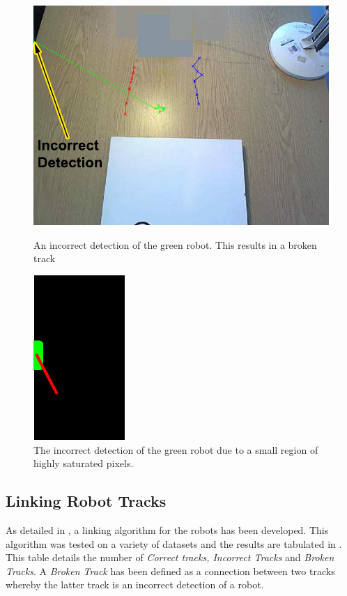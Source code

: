 \documentclass{article}
\begin{document}
\begin{figure}[h!]
\begin{minipage}[b]{0.5\linewidth}
\includegraphics[scale=0.5]{../Drawings/incorrectdetBackdata7.pdf}
\caption{An incorrect detection of the green robot. This results in a broken track}
\label{fig:InDetectData7}
\end{minipage}
\hspace{0.5cm}
\begin{minipage}[b]{0.5\linewidth}
\includegraphics[scale=0.8]{../Drawings/incorrectdetrobotdata7.pdf}
\caption{The incorrect detection of the green robot due to a small region of highly saturated pixels. }
\label{fig:greenInDetect}
\end{minipage}
\end{figure}

\subsection{Linking Robot Tracks}
\label{sec:linking}
As detailed in , a linking algorithm for the robots has been developed. This algorithm was tested on a variety of datasets and the results are tabulated in . This table details the number of \textit{Correct tracks, Incorrect Tracks} and \textit{Broken Tracks}. A \textit{Broken Track} has been defined as a connection between two tracks whereby the latter track is an incorrect detection of a robot. \\
\end{document}
